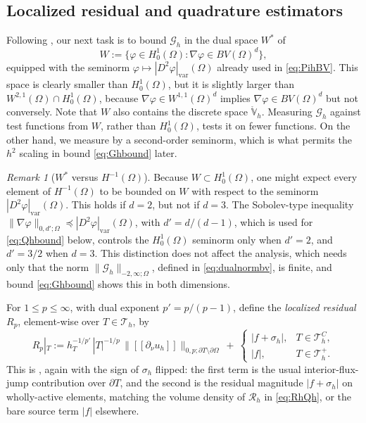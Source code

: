 \documentclass[12pt]{amsart}
\numberwithin{equation}{section}
\theoremstyle{plain}
\theoremstyle{definition}
\theoremstyle{remark}
\newtheorem{remark}[theorem]{Remark}
\newcommand{\Om}{\Omega}
\newcommand{\dOm}{\partial\Omega}
\newcommand{\Th}{\mathcal{T}_h}
\newcommand{\Vhr}{\mathring{\mathbb{V}}_h}
\newcommand{\Thplus}{\Th^+}
\newcommand{\ThC}{\Th^C}
\newcommand{\Gh}{\mathcal{G}_h}
\newcommand{\Rh}{\mathcal{R}_h}
\newcommand{\jump}[1]{[\![#1]\!]}
\begin{document}
\subsection{Localized residual and quadrature estimators}  Following \cite[\S 3.2]{NSV03}, our next task is to bound $\Gh$ in the dual space $W^*$ of
\begin{equation}
\label{eq:W}
  W := \{\varphi \in H_0^1(\Om) : \nabla\varphi \in BV(\Om)^d\},
\end{equation}
equipped with the seminorm $\varphi \mapsto |D^2\varphi|_{\mathrm{var}}(\Om)$ already used in \eqref{eq:PihBV}.  This space is clearly smaller than $H_0^1(\Om)$, but it is slightly larger than $W^{2,1}(\Om) \cap H_0^1(\Om)$, because $\nabla\varphi \in W^{1,1}(\Om)^d$ implies $\nabla\varphi \in BV(\Om)^d$ but not conversely.  Note that $W$ also contains the discrete space $\Vhr$.  Measuring $\Gh$ against test functions from $W$, rather than $H_0^1(\Om)$, tests it on fewer functions.  On the other hand, we measure by a second-order seminorm, which is what permits the $h^2$ scaling in bound \eqref{eq:Ghbound} later.

\begin{remark}[$W^*$ versus $H^{-1}(\Om)$]
\label{rem:dualsizes}
Because $W \subset H_0^1(\Om)$, one might expect every element of $H^{-1}(\Om)$ to be bounded on $W$ with respect to the seminorm $|D^2\varphi|_{\mathrm{var}}(\Om)$.  This holds if $d=2$, but not if $d=3$.  The Sobolev-type inequality $\|\nabla\varphi\|_{0,d';\Om} \preceq |D^2\varphi|_{\mathrm{var}}(\Om)$, with $d' = d/(d-1)$, which is used for \eqref{eq:Qhbound} below, controls the $H_0^1(\Om)$ seminorm only when $d'=2$, and $d'=3/2$ when $d=3$.  This distinction does not affect the analysis, which needs only that the norm $\|\Gh\|_{-2,\infty;\Om}$, defined in \eqref{eq:dualnormbv}, is finite, and bound \eqref{eq:Ghbound} shows this in both dimensions.
\end{remark}

For $1 \le p \le \infty$, with dual exponent $p' = p/(p-1)$, define the \emph{localized residual} $R_p$, element-wise over $T\in\Th$, by
\begin{equation}
\label{eq:Rp}
  R_p|_T := h_T^{-1/p'}\,|T|^{-1/p}\,\bigl\|\jump{\partial_\nu u_h}\bigr\|_{0,p;\partial T \setminus \dOm}
  \ +\ \begin{cases} |f + \sigma_h|, & T \in \ThC, \\ |f|, & T \in \Thplus. \end{cases}
\end{equation}
This is \cite[formula (3.7)]{NSV03}, again with the sign of $\sigma_h$ flipped: the first term is the usual interior-flux-jump contribution over $\partial T$, and the second is the residual magnitude $|f+\sigma_h|$ on wholly-active elements, matching the volume density of $\Rh$ in \eqref{eq:RhQh}, or the bare source term $|f|$ elsewhere.
\end{document}
